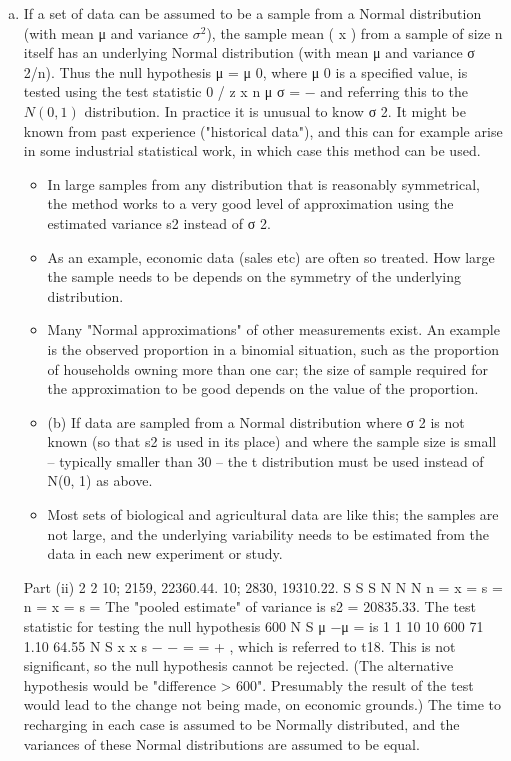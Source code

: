 \documentclass[a4paper,12pt]{article}
\begin{document}
\begin{enumerate}[(a)]
\item If a set of data can be assumed to be a sample from a Normal distribution
(with mean μ and variance $\sigma^2$), the sample mean ( x ) from a sample of size n itself
has an underlying Normal distribution (with mean μ and variance σ 2/n). Thus the null
hypothesis μ = μ 0, where μ 0 is a specified value, is tested using the test statistic
0
/
z x
n
μ
σ
= −
and referring this to the $N(0, 1)$ distribution.
In practice it is unusual to know σ
2. It might be known from past experience
("historical data"), and this can for example arise in some industrial statistical work, in
which case this method can be used.
\begin{itemize}
    \item In large samples from any distribution that is reasonably symmetrical, the method
works to a very good level of approximation using the estimated variance s2 instead of
σ 2.
\item As an example, economic data (sales etc) are often so treated. How large the
sample needs to be depends on the symmetry of the underlying distribution.
\item Many "Normal approximations" of other measurements exist. An example is the
observed proportion in a binomial situation, such as the proportion of households
owning more than one car; the size of sample required for the approximation to be
good depends on the value of the proportion.
\item (b) If data are sampled from a Normal distribution where σ 2 is not known (so that
s2 is used in its place) and where the sample size is small – typically smaller than 30
– the t distribution must be used instead of N(0, 1) as above. 
\item Most sets of biological
and agricultural data are like this; the samples are not large, and the underlying
variability needs to be estimated from the data in each new experiment or study.
\end{itemize}

Part (ii)
2 2 10; 2159, 22360.44. 10; 2830, 19310.22. S S S N N N n = x = s = n = x = s =
The "pooled estimate" of variance is s2 = 20835.33.
The test statistic for testing the null hypothesis 600 N S μ −μ = is
1 1
10 10
600 71 1.10
64.55
N S x x
s
− − = =
+
,
which is referred to t18. This is not significant, so the null hypothesis cannot be
rejected. (The alternative hypothesis would be "difference > 600". Presumably the
result of the test would lead to the change not being made, on economic grounds.)
The time to recharging in each case is assumed to be Normally distributed, and the
variances of these Normal distributions are assumed to be equal.\end{enumerate}
\end{document}

